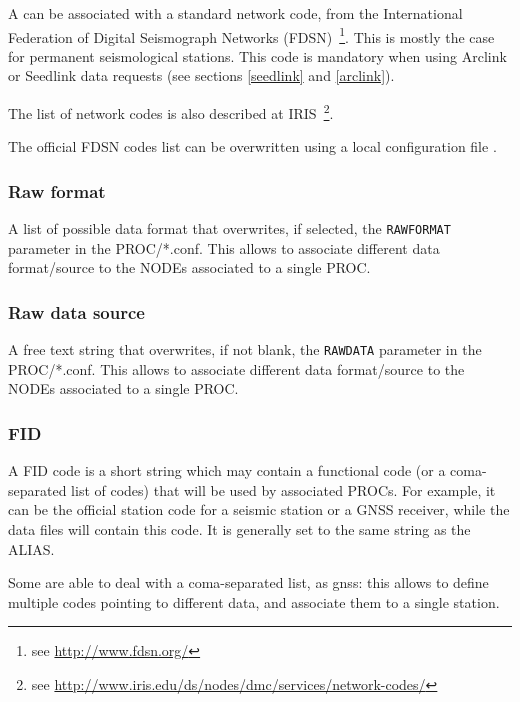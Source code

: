 A  can be associated with a standard network code, from the International Federation of Digital Seismograph Networks (FDSN)~\footnote{see \url{http://www.fdsn.org/}}. This is mostly the case for permanent seismological stations. This code is mandatory when using Arclink or Seedlink data requests (see sections \ref{seedlink} and \ref{arclink}).

The list of network codes is also described at IRIS~\footnote{see \url{http://www.iris.edu/ds/nodes/dmc/services/network-codes/}}.

The official FDSN codes list can be overwritten using a local configuration file .

\subsubsection{Raw format}

A list of possible data format that overwrites, if selected, the \texttt{RAWFORMAT} parameter in the PROC/*.conf. This allows to associate different data format/source to the NODEs associated to a single PROC.


\subsubsection{Raw data source}

A free text string that overwrites, if not blank, the \texttt{RAWDATA} parameter in the PROC/*.conf. This allows to associate different data format/source to the NODEs associated to a single PROC.


\subsubsection{FID}

A FID code is a short string which may contain a functional code (or a coma-separated list of codes) that will be used by associated PROCs. For example, it can be the official station code for a seismic station or a GNSS receiver, while the data files will contain this code. It is generally set to the same string as the ALIAS.

Some  are able to deal with a coma-separated list, as gnss: this allows to define multiple codes pointing to different data, and associate them to a single station.

